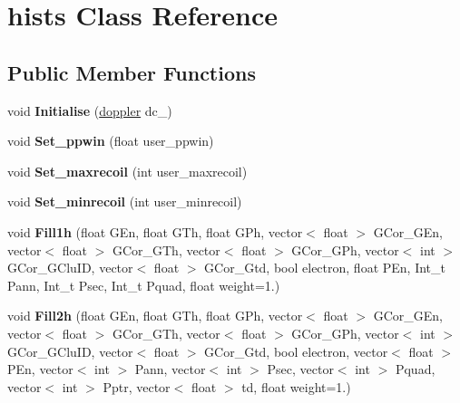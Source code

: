 \hypertarget{classhists}{}\section{hists Class Reference}
\label{classhists}
\subsection*{Public Member Functions}
\begin{DoxyCompactItemize}
\item 
\mbox{\label{classhists_affb3dcaefba3b63d20bbe438030e2f81}} 
void {\bfseries Initialise} (\hyperlink{classdoppler}{doppler} dc\+\_\+)
\item 
\mbox{\label{classhists_a98cf7d91940c6d77105d07b0783399ee}} 
void {\bfseries Set\+\_\+ppwin} (float user\+\_\+ppwin)
\item 
\mbox{\label{classhists_ae986e831e139c9e7e5a4e327e864484d}} 
void {\bfseries Set\+\_\+maxrecoil} (int user\+\_\+maxrecoil)
\item 
\mbox{\label{classhists_acfb845682216224712565e7b8a1c3ce2}} 
void {\bfseries Set\+\_\+minrecoil} (int user\+\_\+minrecoil)
\item 
\mbox{\label{classhists_a4cc3927b58899125a7691a50101fb902}} 
void {\bfseries Fill1h} (float G\+En, float G\+Th, float G\+Ph, vector$<$ float $>$ G\+Cor\+\_\+\+G\+En, vector$<$ float $>$ G\+Cor\+\_\+\+G\+Th, vector$<$ float $>$ G\+Cor\+\_\+\+G\+Ph, vector$<$ int $>$ G\+Cor\+\_\+\+G\+Clu\+ID, vector$<$ float $>$ G\+Cor\+\_\+\+Gtd, bool electron, float P\+En, Int\+\_\+t Pann, Int\+\_\+t Psec, Int\+\_\+t Pquad, float weight=1.)
\item 
\mbox{\label{classhists_a84e3dd3dc98652844bbfea63652eb280}} 
void {\bfseries Fill2h} (float G\+En, float G\+Th, float G\+Ph, vector$<$ float $>$ G\+Cor\+\_\+\+G\+En, vector$<$ float $>$ G\+Cor\+\_\+\+G\+Th, vector$<$ float $>$ G\+Cor\+\_\+\+G\+Ph, vector$<$ int $>$ G\+Cor\+\_\+\+G\+Clu\+ID, vector$<$ float $>$ G\+Cor\+\_\+\+Gtd, bool electron, vector$<$ float $>$ P\+En, vector$<$ int $>$ Pann, vector$<$ int $>$ Psec, vector$<$ int $>$ Pquad, vector$<$ int $>$ Pptr, vector$<$ float $>$ td, float weight=1.)
\item 

\end{DoxyCompactItemize}
